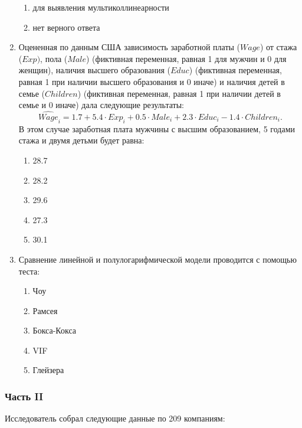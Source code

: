 \begin{enumerate}
\begin{enumerate}
	\item для выявления мультиколлинеарности
	\item нет верного ответа
	\end{enumerate}
\item Оцененная по данным США зависимость заработной платы ($Wage$) от стажа ($Exp)$, пола ($Male$) (фиктивная переменная, равная 1 для мужчин и 0 для женщин), наличия высшего образования ($Educ$) (фиктивная переменная, равная 1 при наличии высшего образования и 0 иначе) и наличия детей в семье ($Children$) (фиктивная переменная, равная 1 при наличии детей в семье и 0 иначе) дала следующие результаты:
 \[
 \widehat{Wage}_i = 1.7 + 5.4 \cdot Exp_i + 0.5 \cdot Male_i + 2.3 \cdot Educ_i - 1.4 \cdot Children_i.
 \]
В этом случае заработная плата мужчины с высшим образованием, 5 годами стажа и двумя детьми будет равна:
	\begin{enumerate}
	\item 28.7
	\item 28.2
	\item 29.6
	\item 27.3
	\item 30.1
	\end{enumerate}
\item Сравнение линейной и полулогарифмической модели проводится с помощью теста:
	\begin{enumerate}
	\item Чоу
	\item Рамсея
	\item Бокса-Кокса
	\item VIF
	\item Глейзера
	\end{enumerate}

\end{enumerate}
\subsubsection*{Часть II}

Исследователь собрал следующие данные по 209 компаниям:

